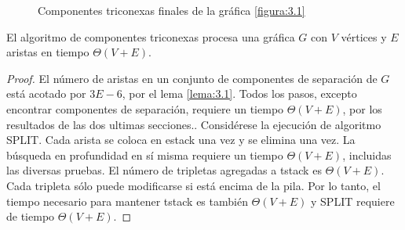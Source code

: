 \begin{figure}[H]
\begin{center}
\begin{subfigure}[b]{0.8\textwidth}
        \end{subfigure}
        \end{center}
     \caption{Componentes triconexas finales de la gráfica \ref{figura:3.1}}
    \label{figura:3.6}
\end{figure}

\begin{lemma}
El algoritmo de componentes triconexas procesa una gráfica $G$ con $V$ vértices y $E$ aristas en tiempo $\Theta \left(V + E\right)$.
\label{lema:3.15}
\end{lemma}

\begin{proof}
El número de aristas en un conjunto de componentes de separación de $G$ está acotado por $3E - 6$, por el lema \ref{lema:3.1}. Todos los pasos, excepto encontrar componentes de separación, requiere un tiempo $\Theta\left(V+ E\right)$, por los resultados de las dos ultimas secciones.. Considérese la ejecución de algoritmo SPLIT. Cada arista se coloca en estack una vez y se elimina una vez. La búsqueda en profundidad en sí misma requiere un tiempo $\Theta\left(V + E\right)$, incluidas las diversas pruebas. El número de tripletas agregadas a tstack es $\Theta\left(V + E\right)$. Cada tripleta sólo puede modificarse si está encima de la pila. Por lo tanto, el tiempo necesario para mantener tstack es también $\Theta\left(V + E\right)$ y SPLIT requiere de tiempo $\Theta\left(V + E\right)$.
\end{proof}
